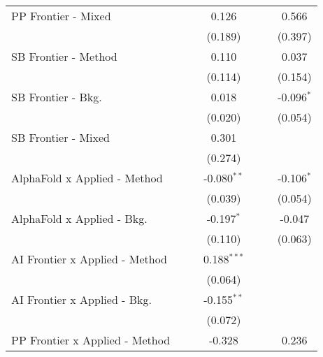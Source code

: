 \begin{tabular}{lcccccc}
   PP Frontier - Mixed            &              &               & 0.126          &               &         & 0.566\\   
                                  &              &               & (0.189)        &               &         & (0.397)\\   
   SB Frontier - Method           &              &               & 0.110          &               &         & 0.037\\   
                                  &              &               & (0.114)        &               &         & (0.154)\\   
   SB Frontier - Bkg.             &              &               & 0.018          &               &         & -0.096$^{*}$\\   
                                  &              &               & (0.020)        &               &         & (0.054)\\   
   SB Frontier - Mixed            &              &               & 0.301          &               &         &   \\   
                                  &              &               & (0.274)        &               &         &   \\   
   AlphaFold x Applied - Method   &              &               & -0.080$^{**}$  &               &         & -0.106$^{*}$\\   
                                  &              &               & (0.039)        &               &         & (0.054)\\   
   AlphaFold x Applied - Bkg.     &              &               & -0.197$^{*}$   &               &         & -0.047\\   
                                  &              &               & (0.110)        &               &         & (0.063)\\   
   AI Frontier x Applied - Method &              &               & 0.188$^{***}$  &               &         &   \\   
                                  &              &               & (0.064)        &               &         &   \\   
   AI Frontier x Applied - Bkg.   &              &               & -0.155$^{**}$  &               &         &   \\   
                                  &              &               & (0.072)        &               &         &   \\   
   PP Frontier x Applied - Method &              &               & -0.328         &               &         & 0.236\\   

\end{tabular}
